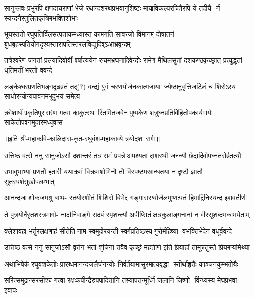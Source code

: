 \fourlineindentedshloka
{सानुप्लवः प्रभुरपि क्षणदाचराणां}
{भेजे रथान्दशरथप्रभवानुशिष्टः}
{मायाविकल्परचितैरपि ये तदीयै-}
{र्न स्यन्दनैस्तुलितकृत्रिमभक्तिशोभाः} %

\twolineshloka
{भूयस्ततो रघुपतिर्विलसत्पताकमध्यास्त कामगति सावरजो विमानम्}
{दोषातनं बुधबृहस्पतियोगदृश्यस्तारापतिस्तरलविद्युदिव्ऽआभ्रवृन्दम्} %

\fourlineindentedshloka
{तत्रेश्वरेण जगतां प्रलयादिवोर्वीं}
{वर्षात्ययेन रुचमभ्रघनादिवेन्दोः}
{रामेण मैथिलसुतां दशकण्ठकृच्छ्रात्}
{प्रत्युद्धृतां धृतिमतीं भरतो ववन्दे} %

\twolineshloka
{लङ्केश्वरप्रणतिभङ्गदृढव्रतं तद्(?) वन्द्यं युगं चरणयोर्जनकात्मजायाः}
{ज्येष्ठानुवृत्तिजटिलं च शिरोऽस्य साधोरन्योन्यपावनमभूदुभयं समेत्य} %

\fourlineindentedshloka
{क्रोशार्धं प्रकृतिपुरःसरेण गत्वा}
{काकुत्स्थः स्तिमितजवेन पुष्पकेण}
{शत्रुघ्नप्रतिविहितोपकार्यमार्यः}
{साकेतोपवनमुदारमध्युवास} %

॥इति श्री-महाकवि-कालिदास-कृत-रघुवंश-महाकाव्ये त्रयोदशः सर्गः॥


\fourlineindentedshloka
{उत्तिष्ठ वत्से ननु सानुजोऽसौ}
{दशान्तरं तत्र समं प्रपन्ने}
{अपश्यतां दाशरथी जनन्यौ}
{छेदादिवोपघ्नतरोर्व्रतत्यौ} %

\twolineshloka
{उभावुभाभ्यां प्रणतौ हतारी यथाक्रमं विक्रमशोभिनौ तौ}
{विस्पष्टमस्रान्धतया न दृष्टौ ज्ञातौ सुतस्पर्शसुखोपलम्भात्} %

\fourlineindentedshloka
{आनन्दजः शोकजमश्रु बाष्प-}
{स्तयोरशीतं शिशिरो बिभेद}
{गङ्गासरय्वोर्जलमुष्णत्पतं}
{हिमाद्रिनिस्यन्द इवावतीर्णः} %

\fourlineindentedshloka
{ते पुत्रयोर्नैरृतशस्त्रमार्गा-}
{नार्द्रानिवाङ्गे सदयं स्पृशन्त्यौ}
{अपीप्सितं क्षत्रकुलाङ्गनानां}
{न वीरसूशब्दमकामयेताम्} %

\fourlineindentedshloka
{क्लेशावहा भर्तुरलक्षणाहं}
{सीतेति नाम स्वमुदीरयन्ती}
{स्वर्गप्रतिष्ठस्य गुरोर्महिष्या-}
{वभक्तिभेदेन वधूर्ववन्दे} %

\fourlineindentedshloka
{उत्तिष्ठ वत्से ननु सानुजोऽसौ}
{वृत्तेन भर्ता शुचिना तवैव}
{कृच्छ्रं महत्तीर्ण इति प्रियार्हां}
{तामूचतुस्ते प्रियमप्यमिथ्या} %

\fourlineindentedshloka
{अथाभिषेकं रघुवंशकेतोः}
{प्रारब्धमानन्दजलैर्जनन्योः}
{निर्वर्तयामासुरमात्यवृद्धा-}
{स्तीर्थाहृतैः काञ्चनकुम्भतोयैः} %

\fourlineindentedshloka
{सरित्समुद्रान्सरसीश्च गत्वा}
{रक्षःकपीन्द्रैरुपपादितानि}
{तस्यापतन्मूर्ध्नि जलानि जिष्णो-}
{र्विन्ध्यस्य मेघप्रभवा इवापः} %

